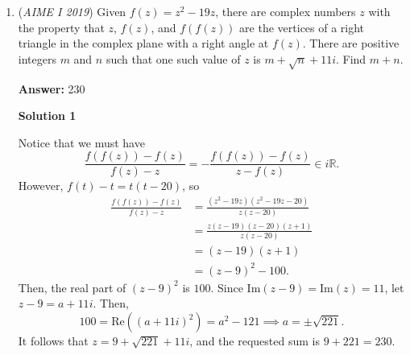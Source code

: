 \begin{enumerate}
 Since $IH_1$ and $O_2H_2$ are both tangent to line $BC$, we can draw from similar triangles the conclusion that:

 
 \[\frac{O_2H_2}{IH_1}=\frac{BO_2}{BI}=\frac{IO_2+BI}{BI}=1+\frac{IO_2}{BI}\]

 Due to the properties of isosceles triangles, it is true that $BH_1=\frac{BC}{2}=\frac{y}{2}$. Since $IH_1=\frac{S}{p}$, from the Pythagorean theorem, we can obtain that $BI=\sqrt{\left(\frac{y}{2}\right)^2+\left(\frac{S}{p}\right)^2}$. After plugging in $S$ and $p$ in terms of $x$ and $y$ and further algebraic procedures, the equation turns into:

 
 \[4x^2-16xy-9y^2=0\]

 Solve $x$ in terms of $y$ and eliminate the negative root to get:

 
 \[x=4.5y\]

 Therefore, the minimum of the perimeter of $\triangle ABC$ with integer side lengths is $2\times9+2=\boxed{020}$

 


 \href{https://mathproblemsolvingskills.wordpress.com/}{MathProblemSolvingSkills.com}

 


 This solution is the video solution for Solution 3 - not posted by ~KingRavi

 


	\item (\textit{AIME I 2019}) Given $f(z) = z^2-19z$, there are complex numbers $z$ with the property that $z$, $f(z)$, and $f(f(z))$ are the vertices of a right triangle in the complex plane with a right angle at $f(z)$. There are positive integers $m$ and $n$ such that one such value of $z$ is $m+\sqrt{n}+11i$. Find $m+n$.


 
 \textbf{Answer: }230



\textbf{Solution 1}

Notice that we must have 
 \[\frac{f(f(z))-f(z)}{f(z)-z}=-\frac{f(f(z))-f(z)}{z-f(z)}\in i\mathbb R .\]However, $f(t)-t=t(t-20)$, so
 \begin{align*} \frac{f(f(z))-f(z)}{f(z)-z}&=\frac{(z^2-19z)(z^2-19z-20)}{z(z-20)}\\ &=\frac{z(z-19)(z-20)(z+1)}{z(z-20)}\\ &=(z-19)(z+1)\\ &=(z-9)^2-100. \end{align*}
Then, the real part of $(z-9)^2$ is $100$. Since $\text{Im}(z-9)=\text{Im}(z)=11$, let $z-9=a+11i$. Then, 
 \[100=\text{Re}((a+11i)^2)=a^2-121\implies a=\pm\sqrt{221}.\]It follows that $z=9+\sqrt{221}+11i$, and the requested sum is $9+221=\boxed{230}$.


\end{enumerate}
